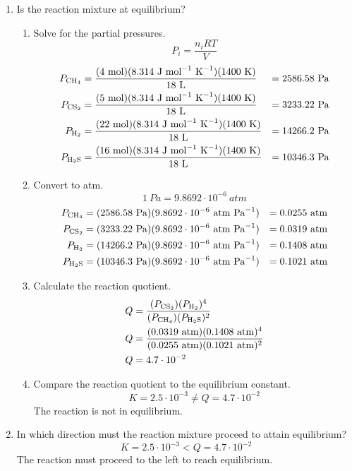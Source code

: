 \documentclass{article}
\begin{document}
\begin{enumerate}
    \item Is the reaction mixture at equilibrium?
    \begin{enumerate}
        \item Solve for the partial pressures.
        $$P_{i} = \frac{n_{i} R T}{V}$$
        \begin{align*}
            P_{\ce{CH_{4}}} &= \frac{(4\ \si{mol})(8.314\ \si{J\ mol^{-1}\
    K^{-1}})(1400\ \si{K})}{18\ \si{L}}&=2586.58\ \si{Pa}\\
            P_{\ce{CS_{2}}} &= \frac{(5\ \si{mol})(8.314\ \si{J\ mol^{-1}\
    K^{-1}})(1400\ \si{K})}{18\ \si{L}}&=3233.22\ \si{Pa}\\
            P_{\ce{H_{2}}} &= \frac{(22\ \si{mol})(8.314\ \si{J\ mol^{-1}\
    K^{-1}})(1400\ \si{K})}{18\ \si{L}}&=14266.2\ \si{Pa}\\
            P_{\ce{H_{2}S}} &= \frac{(16\ \si{mol})(8.314\ \si{J\ mol^{-1}\
    K^{-1}})(1400\ \si{K})}{18\ \si{L}}&=10346.3\ \si{Pa}
        \end{align*} 
        \item Convert to \si{atm}.
        $$1\ \si{Pa} = 9.8692\cdot10^{-6}\ \si{atm}$$
        \begin{align*}
            P_{\ce{CH_{4}}} &= (2586.58\ \si{Pa})(9.8692\cdot10^{-6}\ \si{atm\
        Pa^{-1}}) &= 0.0255\ \si{atm}\\
            P_{\ce{CS_{2}}} &= (3233.22\ \si{Pa})(9.8692\cdot10^{-6}\ \si{atm\
        Pa^{-1}}) &= 0.0319\ \si{atm}\\
            P_{\ce{H_{2}}} &= (14266.2\ \si{Pa})(9.8692\cdot10^{-6}\ \si{atm\
        Pa^{-1}}) &= 0.1408\ \si{atm}\\
            P_{\ce{H_{2}S}} &= (10346.3\ \si{Pa})(9.8692\cdot10^{-6}\ \si{atm\
        Pa^{-1}}) &= 0.1021\ \si{atm}
        \end{align*} 
        \item Calculate the reaction quotient.
        \begin{align*}
            Q&=\frac{(P_{\ce{CS_{2}}})(P_{\ce{H_{2}}})^{4}}{(P_{\ce{CH_{4}}})(P_{\ce{H_{2}S}})^{2}}\\
            Q&=\frac{(0.0319\ \si{atm})(0.1408\ \si{atm})^{4}}{(0.0255\
        \si{atm})(0.1021\ \si{atm})^{2}}\\
            Q&=4.7\cdot10^{-2}
        \end{align*}
        \item Compare the reaction quotient to the equilibrium constant.
        $$K=2.5\cdot10^{-3} \ne Q=4.7\cdot10^{-2}$$
        The reaction is not in equilibrium.
    \end{enumerate}
    \item In which direction must the reaction mixture proceed to attain
        equilibrium?
    $$K=2.5\cdot10^{-3} < Q=4.7\cdot10^{-2}$$
    The reaction must proceed to the left to reach equilibrium.
    
\end{enumerate}
\end{document}
